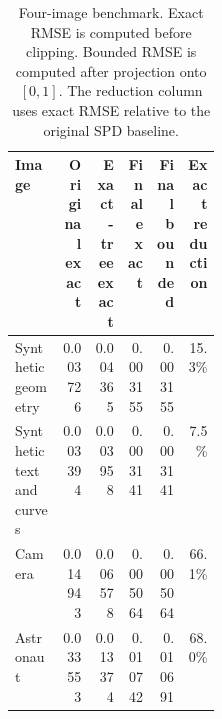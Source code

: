 \begin{table}[tbp]
\centering
\small
\begin{tabular}{L{0.235\linewidth}rrrrr}
\toprule
Image & Original exact & Exact-tree exact & Final exact & Final bounded & Exact reduction\\
\midrule
Synthetic geometry & 0.003726 & 0.004365 & 0.003155 & 0.003155 & 15.3\%\\
Synthetic text and curves & 0.003394 & 0.003958 & 0.003141 & 0.003141 & 7.5\%\\
Camera & 0.014943 & 0.006578 & 0.005064 & 0.005064 & 66.1\%\\
Astronaut & 0.033553 & 0.013374 & 0.010742 & 0.010691 & 68.0\%\\
\bottomrule
\end{tabular}
\caption{Four-image benchmark. Exact RMSE is computed before clipping. Bounded RMSE is computed after projection onto $[0,1]$. The reduction column uses exact RMSE relative to the original SPD baseline.}
\label{tab:final-four-case-corrected}
\end{table}
